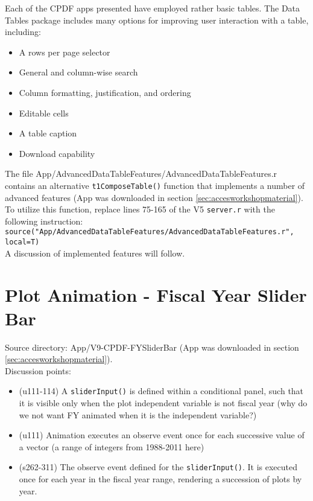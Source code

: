 \documentclass[10pt, letterpaper]{article}
\begin{document}
\begin{spacing}{1.0}
Each of the CPDF apps presented have employed rather basic tables.  The Data Tables package includes many options for improving user interaction with a table, including:

\begin{itemize}[noitemsep]
    \item A rows per page selector
    \item General and column-wise search
    \item Column formatting, justification, and ordering
    \item Editable cells
    \item A table caption
    \item Download capability
\end{itemize}

The file App/AdvancedDataTableFeatures/AdvancedDataTableFeatures.r contains an alternative \texttt{t1ComposeTable()} function that implements a number of advanced features (App was downloaded in section \ref{sec:accesworkshopmaterial}).  To utilize this function, replace lines 75-165 of the V5 \texttt{server.r} with the following instruction:\\

\small
\texttt{source("App/AdvancedDataTableFeatures/AdvancedDataTableFeatures.r", local=T)}
\normalsize\\

A discussion of implemented features will follow.


\section{Plot Animation - Fiscal Year Slider Bar}\label{sec:sliderbar}

Source directory:  App/V9-CPDF-FYSliderBar (App was downloaded in section \ref{sec:accesworkshopmaterial}).\\

Discussion points:

\begin{itemize}
    \item (u111-114) A \texttt{sliderInput()} is defined within a conditional panel, such that it is visible only when the plot independent variable is not fiscal year (why do we not want FY animated when it is the independent variable?)
    \item (u111) Animation executes an observe event once for each successive value of a vector (a range of integers from 1988-2011 here)
    \item (s262-311) The observe event defined for the \texttt{sliderInput()}.  It is executed once for each year in the fiscal year range, rendering a succession of plots by year.
\end{itemize}


\end{spacing}
\end{document}
